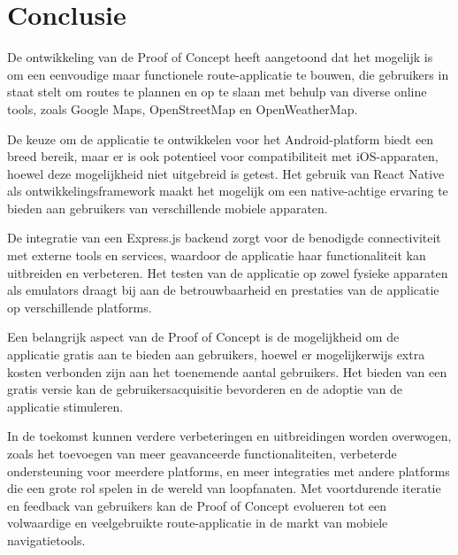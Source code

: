 
\chapter{Conclusie}%
\label{ch:conclusie}


De ontwikkeling van de Proof of Concept heeft aangetoond dat het mogelijk is om een eenvoudige maar functionele route-applicatie te bouwen, die gebruikers in staat stelt om routes te plannen en op te slaan met behulp van diverse online tools, zoals Google Maps, OpenStreetMap en OpenWeatherMap.

\vspace{1cm}


De keuze om de applicatie te ontwikkelen voor het Android-platform biedt een breed bereik, maar er is ook potentieel voor compatibiliteit met iOS-apparaten, hoewel deze mogelijkheid niet uitgebreid is getest. Het gebruik van React Native als ontwikkelingsframework maakt het mogelijk om een native-achtige ervaring te bieden aan gebruikers van verschillende mobiele apparaten.

\vspace{1cm}


De integratie van een Express.js backend zorgt voor de benodigde connectiviteit met externe tools en services, waardoor de applicatie haar functionaliteit kan uitbreiden en verbeteren. Het testen van de applicatie op zowel fysieke apparaten als emulators draagt bij aan de betrouwbaarheid en prestaties van de applicatie op verschillende platforms.

\vspace{1cm}


Een belangrijk aspect van de Proof of Concept is de mogelijkheid om de applicatie gratis aan te bieden aan gebruikers, hoewel er mogelijkerwijs extra kosten verbonden zijn aan het toenemende aantal gebruikers. Het bieden van een gratis versie kan de gebruikersacquisitie bevorderen en de adoptie van de applicatie stimuleren.

\vspace{1cm}


In de toekomst kunnen verdere verbeteringen en uitbreidingen worden overwogen, zoals het toevoegen van meer geavanceerde functionaliteiten, verbeterde ondersteuning voor meerdere platforms, en meer integraties met andere platforms die een grote rol spelen in de wereld van loopfanaten. Met voortdurende iteratie en feedback van gebruikers kan de Proof of Concept evolueren tot een volwaardige en veelgebruikte route-applicatie in de markt van mobiele navigatietools.


